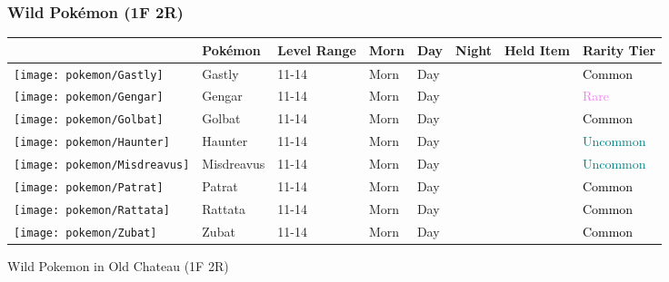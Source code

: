 \subsubsection{Wild Pokémon (1F 2R)}%
\label{ssubsec:WildPokmon(1F2R)}%
\begin{longtable}{||l l l l l l l l||}%
\hline%
&Pokémon&Level Range&Morn&Day&Night&Held Item&Rarity Tier\\%
\hline%
\endhead%
\hline%
\texttt{[image: pokemon/Gastly]}&Gastly&11{-}14&Morn&Day&&&\textcolor{black}{%
Common%
}\\%
\hline%
\texttt{[image: pokemon/Gengar]}&Gengar&11{-}14&Morn&Day&&&\textcolor{violet}{%
Rare%
}\\%
\hline%
\texttt{[image: pokemon/Golbat]}&Golbat&11{-}14&Morn&Day&&&\textcolor{black}{%
Common%
}\\%
\hline%
\texttt{[image: pokemon/Haunter]}&Haunter&11{-}14&Morn&Day&&&\textcolor{teal}{%
Uncommon%
}\\%
\hline%
\texttt{[image: pokemon/Misdreavus]}&Misdreavus&11{-}14&Morn&Day&&&\textcolor{teal}{%
Uncommon%
}\\%
\hline%
\texttt{[image: pokemon/Patrat]}&Patrat&11{-}14&Morn&Day&&&\textcolor{black}{%
Common%
}\\%
\hline%
\texttt{[image: pokemon/Rattata]}&Rattata&11{-}14&Morn&Day&&&\textcolor{black}{%
Common%
}\\%
\hline%
\texttt{[image: pokemon/Zubat]}&Zubat&11{-}14&Morn&Day&&&\textcolor{black}{%
Common%
}\\%
\hline%
\end{longtable}%
\caption{Wild Pokemon in Old Chateau (1F 2R)}